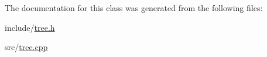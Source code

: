 The documentation for this class was generated from the following files\+:\begin{DoxyCompactItemize}
\item 
include/\hyperlink{tree_8h}{tree.\+h}\item 
src/\hyperlink{tree_8cpp}{tree.\+cpp}\end{DoxyCompactItemize}
